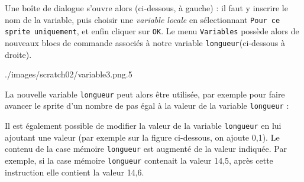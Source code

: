 
Une boîte de dialogue s'ouvre alors (ci-dessous, à gauche) : il faut y inscrire le nom de la variable, puis choisir une \emph{variable locale} en sélectionnant \texttt{Pour ce sprite uniquement}, et enfin cliquer sur \texttt{OK}. Le menu \texttt{Variables} possède alors de nouveaux blocs de commande associés à notre variable \texttt{longueur}(ci-dessous à droite).

%
              {./images/scratch02/variable3.png}{.5\textwidth}

La nouvelle variable \texttt{longueur} peut alors être utilisée, par exemple pour faire avancer le sprite d'un nombre de pas égal à la valeur de la variable \texttt{longueur} :


Il est également possible de modifier la valeur de la variable \texttt{longueur} en lui ajoutant une valeur (par exemple sur la figure ci-dessous, on ajoute 0,1). Le contenu de la case mémoire \texttt{longueur} est augmenté de la valeur indiquée. Par exemple, si la case mémoire \texttt{longueur} contenait la valeur 14,5, après cette instruction elle contient la valeur 14,6.    


\vfill
\phantom{rien}


